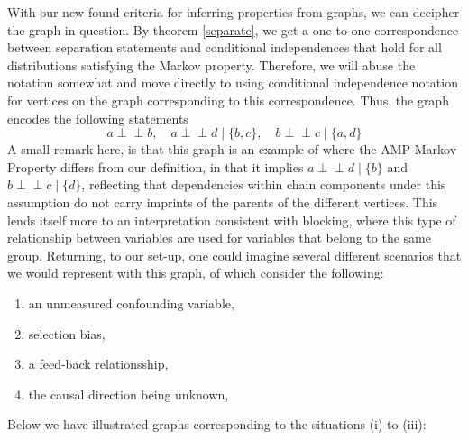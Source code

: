 \documentclass[11pt, a4paper]{memoir}
\theoremstyle{break}
\theoremstyle{break}
\theoremstyle{nonumberplain}
\newcommand{\indep}{\perp \!\!\! \perp}
\begin{document}
\begin{center}
\end{center}
With our new-found criteria for inferring properties from graphs, we can decipher the graph in question. By theorem \ref{separate}, we get a one-to-one correspondence between separation statements and conditional independences that hold for all distributions satisfying the Markov property. Therefore, we will abuse the notation somewhat and move directly to using conditional independence notation for vertices on the graph corresponding to this correspondence. Thus, the graph encodes the following statements
$$a\indep b,\quad a\indep d\mid \{b,c\},\quad b\indep c\mid \{a,d\}$$
A small remark here, is that this graph is an example of where the AMP Markov Property differs from our definition, in that it implies $a\indep d\mid\{b\}$ and $b\indep c\mid\{d\}$, reflecting that dependencies within chain components under this assumption do not carry imprints of the parents of the different vertices. This lends itself more to an interpretation consistent with blocking, where this type of relationship between variables are used for variables that belong to the same group. Returning, to our set-up, one could imagine several different scenarios that we would represent with this graph, of which \cite{ChainGraph} consider the following:
\begin{enumerate}[label=(\roman*)]
	\item an unmeasured confounding variable,
	\item selection bias,
	\item a feed-back relationsship,
	\item the causal direction being unknown,
\end{enumerate}
Below we have illustrated graphs corresponding to the situations (i) to (iii):
\end{document}
